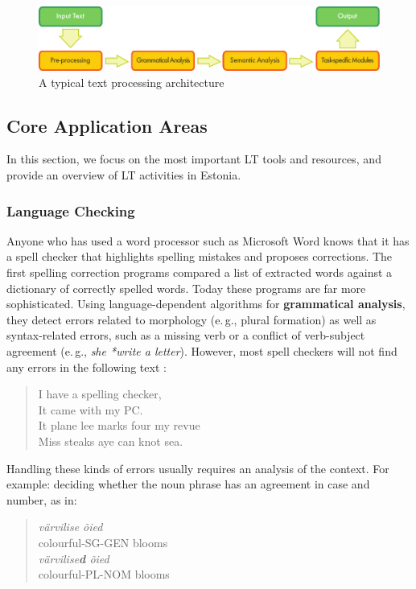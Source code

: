 \begin{multicols}{2}
\begin{figure}[htb]
  \center
  \includegraphics[width=\textwidth]{../_media/english/text_processing_app_architecture}
  \caption{A typical text processing architecture}
  \label{fig:textprocessingarch_en}
\end{figure}

\subsection{Core Application Areas}

In this section, we focus on the most important LT tools and resources, and provide an overview of LT activities in Estonia. 

\subsubsection{Language Checking}

Anyone who has used a word processor such as Microsoft Word knows that it has a spell checker that highlights spelling mistakes and proposes corrections. The first spelling correction programs compared a list of extracted words against a dictionary of correctly spelled words. Today these programs are far more sophisticated. Using language-dependent algorithms for \textbf{grammatical analysis}, they detect errors related to morphology (e.\,g., plural formation) as well as syntax-related errors, such as a missing verb or a conflict of verb-subject agreement (e.\,g., \textit{she *write a letter}). However, most spell checkers will not find any errors in the following text \cite{zar1}:

\begin{quote}
  I have a spelling checker,\\
  It came with my PC.\\
  It plane lee marks four my revue\\
  Miss steaks aye can knot sea.
\end{quote}

Handling these kinds of errors usually requires an analysis of the context. For example: deciding whether the noun phrase has an agreement in case and number, as in:
\begin{quote}
 \textit {värvilise õied}\\ 
 colourful-SG-GEN blooms\\
 \textit {värvilise\textbf{d} õied}\\
 colourful-PL-NOM blooms
\end{quote}


\end{multicols}

